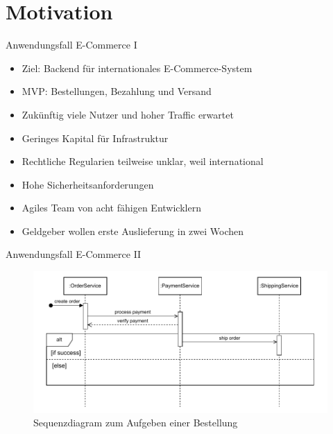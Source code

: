 \section*{Motivation}

\begin{frame}{Anwendungsfall E-Commerce I}
    \begin{itemize}
        \item Ziel: Backend für internationales E-Commerce-System
        \item MVP: Bestellungen, Bezahlung und Versand
        \item Zukünftig viele Nutzer und hoher Traffic erwartet
        \item Geringes Kapital für Infrastruktur
        \item Rechtliche Regularien teilweise unklar, weil international
        \item Hohe Sicherheitsanforderungen
        \item Agiles Team von acht fähigen Entwicklern
        \item Geldgeber wollen erste Auslieferung in zwei Wochen
    \end{itemize}
\end{frame}

\begin{frame}{Anwendungsfall E-Commerce II}
    \begin{figure}[!h]
        \centering
        \includegraphics[scale=0.65]{imglib/einleitung/ecommerce.drawio}
        \caption{Sequenzdiagram zum Aufgeben einer Bestellung}
        \label{fig:ecommerce}
    \end{figure}
\end{frame}

